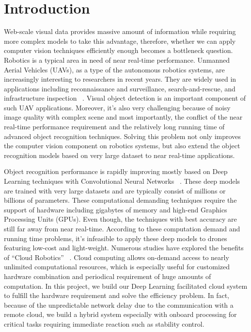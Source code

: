 \section{Introduction}
Web-scale visual data provides massive amount of information while requiring more complex models to take this advantage, therefore, whether we can apply computer vision techniques efficiently enough becomes a bottleneck question.
Robotics is a typical area in need of near real-time performance. Unmanned Aerial Vehicles (UAVs), as a type of the autonomous robotics systems, are increasingly interesting to researchers in recent years. 
They are widely used in applications including reconnaissance and surveillance, search-and-rescue, and infrastructure inspection ~\cite{c1,c3,c5}.
Visual object detection is an important component of such UAV applications.
Moreover, it's also very challenging because of noisy image quality with complex scene and most importantly, the conflict of the near real-time performance requirement and the relatively long running time of advanced object recognition techniques.
Solving this problem not only improves the computer vision component on robotics systems, but also extend the object recognition models based on very large dataset to near real-time applications.

Object recognition performance is rapidly improving mostly based on Deep Learning techniques with Convolutional Neural Networks ~\cite{c13,c14,c15}.
These deep models are trained with very large datasets and are typically consist of millions or billions of parameters. 
These computational demanding techniques require the support of hardware including gigabytes of memory and high-end Graphics Processing Units (GPUs). 
Even though, the techniques with best accuracy are still far away from near real-time. According to these computation demand and running time problems, it's infeasible to apply these deep models to drones featuring low-cost and light-weight.
Numerous studies have explored the benefits of ``Cloud Robotics'' ~\cite{c22,c23}.
Cloud computing allows on-demand access to nearly unlimited computational resources, which is especially useful for customized hardware combination and periodical requirement of huge amounts of computation. In this project, we build our Deep Learning facilitated cloud system to fulfill the hardware requirement and solve the efficiency problem. In fact, because of the unpredictable network delay due to the communication with a remote cloud, we build a hybrid system especially with onboard processing for critical tasks requiring immediate reaction such as stability control. 

